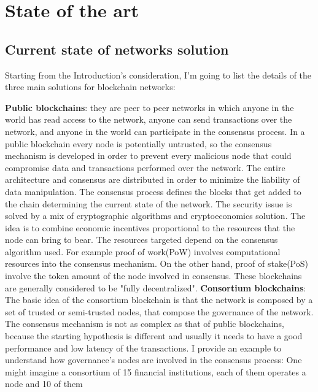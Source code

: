 \chapter{State of the art}

\section{Current state of networks solution}

Starting from the Introduction's consideration, I'm going to list the details of the three main solutions for 
blockchain networks\cite{private-public}:

\begin{outline}
    \1 \textbf{Public blockchains}: they are peer to peer networks in which anyone in the world has read 
    access to the network, anyone can send transactions over the network, and anyone in the world can 
    participate in the consensus process. In a public blockchain every node is potentially 
    untrusted, so the consensus mechanism is developed in order to prevent every malicious node that could 
    compromise data and transactions performed over the network. The entire architecture and consensus are 
    distributed in order to minimize the liability of data manipulation. The consensus process defines the blocks that get added to the chain
    determining the current state of the network. The security issue is solved by a mix of cryptographic algorithms
    and cryptoeconomics solution. The idea is to combine economic incentives proportional to the resources that
    the node can bring to bear. The resources targeted depend on the consensus algorithm used. For example proof of work(PoW)
    involves computational resources into the consensus mechanism. On the other hand, proof of stake(PoS) involve
    the token amount of the node involved in consensus. These blockchains are generally considered 
    to be "fully decentralized".
    \1 \textbf{Consortium blockchains}: The basic idea of the consortium blockchain is that the network is 
    composed by a set of trusted or semi-trusted nodes, that compose the governance of the network.
    The consensus mechanism is not as complex as that of public blockchains, because the starting hypothesis is 
    different and usually it needs to have a good performance and low latency of the transactions.
    I provide an example to understand how governance's nodes are involved in the consensus process: 
    One might imagine a consortium of 15 financial institutions, each of them operates a node and 10 of them 

\end{outline}
